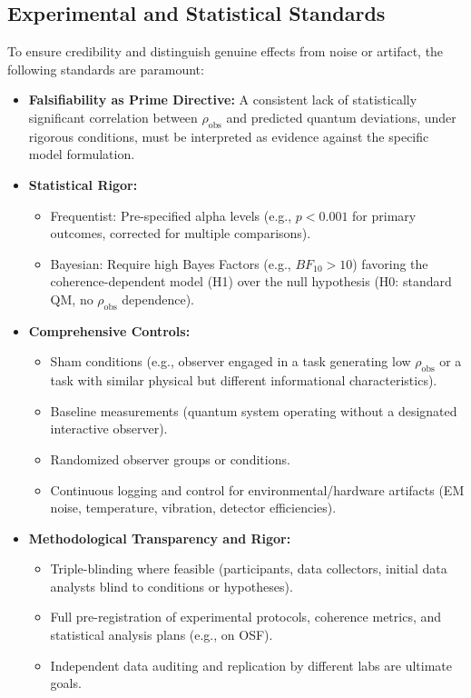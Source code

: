 \documentclass[11pt, a4paper]{book}
\begin{document}
\subsection{Experimental and Statistical Standards}
\label{ssec:empiricalpredictions_standards}
To ensure credibility and distinguish genuine effects from noise or artifact, the following standards are paramount:
\begin{itemize}
    \item \textbf{Falsifiability as Prime Directive:} A consistent lack of statistically significant correlation between $\rho_{\text{obs}}$ and predicted quantum deviations, under rigorous conditions, must be interpreted as evidence against the specific model formulation.
    \item \textbf{Statistical Rigor:}
    \begin{itemize}
        \item Frequentist: Pre-specified alpha levels (e.g., $p < 0.001$ for primary outcomes, corrected for multiple comparisons).
        \item Bayesian: Require high Bayes Factors (e.g., $BF_{10} > 10$) favoring the coherence-dependent model (H1) over the null hypothesis (H0: standard QM, no $\rho_{\text{obs}}$ dependence).
    \end{itemize}
    \item \textbf{Comprehensive Controls:}
    \begin{itemize}
        \item Sham conditions (e.g., observer engaged in a task generating low $\rho_{\text{obs}}$ or a task with similar physical but different informational characteristics).
        \item Baseline measurements (quantum system operating without a designated interactive observer).
        \item Randomized observer groups or conditions.
        \item Continuous logging and control for environmental/hardware artifacts (EM noise, temperature, vibration, detector efficiencies).
    \end{itemize}
    \item \textbf{Methodological Transparency and Rigor:}
    \begin{itemize}
        \item Triple-blinding where feasible (participants, data collectors, initial data analysts blind to conditions or hypotheses).
        \item Full pre-registration of experimental protocols, coherence metrics, and statistical analysis plans (e.g., on OSF).
        \item Independent data auditing and replication by different labs are ultimate goals.
    \end{itemize}
\end{itemize}
\end{document}
